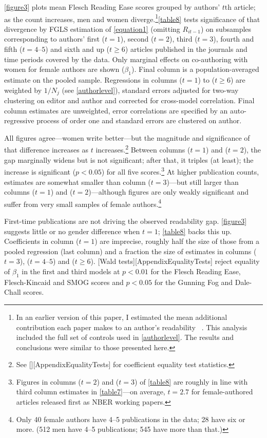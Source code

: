 \begin{appendices}
\autoref{figure3} plots mean Flesch Reading Ease scores grouped by authors' $t\text{th}$ article; as the count increases, men and women diverge.\footnote{In an earlier version of this paper, I estimated the mean additional contribution each paper makes to an author's readability ~\citep[][pp. 23--24]{Hengel2016}. This analysis included the full set of controls used in \autoref{authorlevel}. The results and conclusions were similar to those presented here.}\autoref{table8} tests significance of that divergence by FGLS estimation of \autoref{equation1} (omitting $R_{it-1}$) on subsamples corresponding to authors' first ($t=1$), second ($t=2$), third ($t=3$), fourth and fifth ($t=4\text{--}5$) and sixth and up ($t\ge6$) articles published in the journals and time periods covered by the data. Only marginal effects on co-authoring with women for female authors are shown ($\beta_1$). Final column is a population-averaged estimate on the pooled sample. Regressions in columns ($t=1$) to ($t\ge6$) are weighted by $1/N_j$ (see \autoref{authorlevel}), standard errors adjusted for two-way clustering on editor and author and corrected for cross-model correlation. Final column estimates are unweighted, error correlations are specified by an auto-regressive process of order one and standard errors are clustered on author.

All figures agree---women write better---but the magnitude and significance of that difference increases as $t$ increases.\footnote{See [][AppendixEqualityTests] for coefficient equality test statistics.} Between columns ($t=1$) and ($t=2$), the gap marginally widens but is not significant; after that, it triples (at least); the increase is significant ($p<0.05$) for all five scores.\footnote{Figures in columns ($t=2$) and ($t=3$) of \autoref{table8} are roughly in line with third column estimates in \autoref{table7}---on average, $t=2.7$ for female-authored articles released first as NBER working papers.} At higher publication counts, estimates are somewhat smaller than column ($t=3$)---but still larger than columns ($t=1$) and ($t=2$)---although figures are only weakly significant and suffer from very small samples of female authors.\footnote{Only 40 female authors have 4--5 publications in the data; 28 have six or more. (512 men have 4--5 publications; 545 have more than that.)}



First-time publications are not driving the observed readability gap. \autoref{figure3} suggests little or no gender difference when $t=1$; \autoref{table8} backs this up. Coefficients in column ($t=1$) are imprecise, roughly half the size of those from a pooled regression (last column) and a fraction the size of estimates in columns ($t=3$), ($t=4\text{--}5$) and ($t\ge6$). [Wald tests][AppendixEqualityTests] reject equality of $\beta_1$ in the first and third models at $p<0.01$ for the Flesch Reading Ease, Flesch-Kincaid and SMOG scores and $p<0.05$ for the Gunning Fog and Dale-Chall scores.


\end{appendices}
